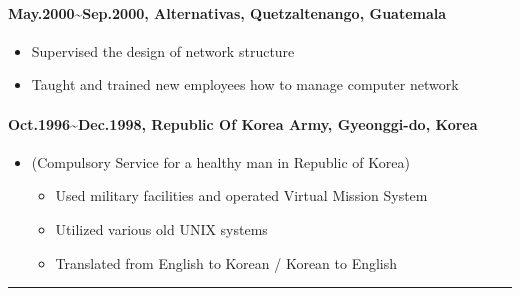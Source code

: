\documentclass[12pt,a4paper]{article}
\begin{document}
\paragraph{May.2000{\textasciitilde}Sep.2000, Alternativas, Quetzaltenango, Guatemala}
\begin{itemize}
\item Supervised the design of network structure


\item Taught and trained new employees how to manage computer network

\end{itemize}
\paragraph{Oct.1996{\textasciitilde}Dec.1998, Republic Of Korea Army, Gyeonggi-do, Korea}
\begin{itemize}
\item (Compulsory Service for a healthy man in Republic of Korea)

\begin{itemize}
\item Used military facilities and operated Virtual Mission System


\item Utilized various old UNIX systems


\item Translated from English to Korean / Korean to English

\end{itemize}
\end{itemize}
\rule{\textwidth}{1pt}
\end{document}

